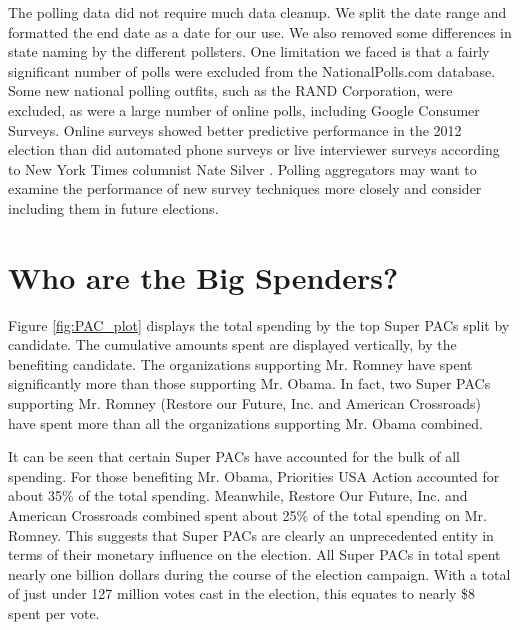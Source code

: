 \documentclass[11pt]{article}\usepackage{graphicx, color}
\begin{document}
The polling data did not require much data cleanup. We split the date range and formatted the end date as a date for our use. We also removed some differences in state naming by the different pollsters. One limitation we faced is that a fairly significant number of polls were excluded from the NationalPolls.com database. Some new national polling outfits, such as the RAND Corporation, were excluded, as were a large number of online polls, including Google Consumer Surveys. Online surveys showed better predictive performance in the 2012 election than did automated phone surveys or live interviewer surveys according to New York Times columnist Nate Silver \cite{ns-polls}. Polling aggregators may want to examine the performance of new survey techniques more closely and consider including them in future elections.


\section{Who are the Big Spenders?}
Figure \ref{fig:PAC_plot} displays the total spending by the top Super PACs split by candidate. The cumulative amounts spent are displayed vertically, by the benefiting candidate. The organizations supporting Mr. Romney have spent significantly more than those supporting Mr. Obama. In fact, two Super PACs supporting Mr. Romney (Restore our Future, Inc. and American Crossroads) have spent more than all the organizations supporting Mr. Obama combined.

It can be seen that certain Super PACs have accounted for the bulk of all spending. For those benefiting Mr. Obama, Priorities USA Action accounted for about 35\% of the total spending. Meanwhile, Restore Our Future, Inc. and American Crossroads combined spent about 25\% of the total spending on Mr. Romney. This suggests that Super PACs are clearly an unprecedented entity in terms of their monetary influence on the election. All Super PACs in total spent nearly one billion dollars during the course of the election campaign. With a total of just under 127 million votes cast in the election, this equates to nearly \$8 spent per vote.
\end{document}
